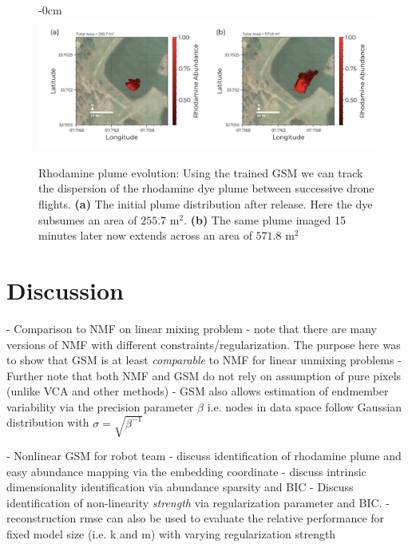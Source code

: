 \documentclass[remotesensing,article,submit,pdftex,moreauthors]{Definitions/mdpi}
\begin{document}
\begin{figure}[H]
\begin{adjustwidth}{-\extralength}{0cm}
\centering
\includegraphics[width=1.25\columnwidth]{results/robot-team/plume-evo.pdf}
\end{adjustwidth}
\caption{Rhodamine plume evolution: Using the trained GSM we can track the dispersion of the rhodamine dye plume between successive drone flights. \textbf{(a)} The initial plume distribution after release. Here the dye subsumes an area of $255.7$ $\text{m}^2$. \textbf{(b)} The same plume imaged 15 minutes later now extends across an area of $571.8$ $\text{m}^2$}
\label{fig:plume-evo}
\end{figure}  


\section{Discussion}\label{sec:disucssion}

- Comparison to NMF on linear mixing problem
    - note that there are many versions of NMF with different constraints/regularization. The purpose here was to show that GSM is at least \textit{comparable} to NMF for linear unmixing problems
    - Further note that both NMF and GSM do not rely on assumption of pure pixels (unlike VCA and other methods) 
    - GSM also allows estimation of endmember variability via the precision parameter $\beta$ i.e. nodes in data space follow Gaussian distribution with $\sigma = \sqrt{\beta^{-1}}$

- Nonlinear GSM for robot team 
    - discuss identification of rhodamine plume and easy abundance mapping via the embedding coordinate
    - discuss intrinsic dimensionality identification via abundance sparsity and BIC
    - Discuss identification of non-linearity \textit{strength} via regularization parameter and BIC.
    - reconstruction rmse can also be used to evaluate the relative performance for fixed model size (i.e. k and m) with varying regularization strength
\end{document}
